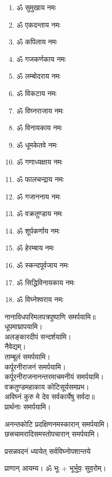 \setlength{\columnseprule}{0pt}
\renewcommand{\labelenumi}{\devanumber\theenumi.}
\begin{multicols}{2}
\begin{enumerate}
\item ॐ सुमुखाय नमः
\item ॐ एकदन्ताय नमः
\item ॐ कपिलाय नमः
\item ॐ गजकर्णकाय नमः
\item ॐ लम्बोदराय नमः
\item ॐ विकटाय नमः
\item ॐ विघ्नराजाय नमः
\item ॐ विनायकाय नमः
\item ॐ धूमकेतवे नमः
\item ॐ गणाध्यक्षाय नमः
\item ॐ फालचन्द्राय नमः
\item ॐ गजाननाय नमः
\item ॐ वक्रतुण्डाय नमः
\item ॐ शूर्पकर्णाय नमः
\item ॐ हेरम्बाय नमः
\item ॐ स्कन्दपूर्वजाय नमः
\item ॐ सिद्धिविनायकाय नमः
\item ॐ विघ्नेश्वराय नमः
\end{enumerate}
\end{multicols}
नानाविधपरिमलपत्रपुष्पाणि समर्पयामि॥\\
धूपमाघ्रापयामि।\\
अलङ्कारदीपं सन्दर्शयामि।\\
नैवेद्यम्।\\
ताम्बूलं समर्पयामि।\\
कर्पूरनीराजनं समर्पयामि।\\
कर्पूरनीराजनानन्तरमाचमनीयं समर्पयामि।\\
{वक्रतुण्डमहाकाय कोटिसूर्यसमप्रभ।}\\
{अविघ्नं कुरु मे देव सर्वकार्येषु सर्वदा॥}\\
प्रार्थनाः समर्पयामि।

अनन्तकोटि प्रदक्षिणनमस्कारान् समर्पयामि।\\
छत्त्रचामरादिसमस्तोपचारान् समर्पयामि।\\


{प्रसन्नवदनं ध्यायेत् सर्वविघ्नोपशान्तये}
 
प्राणान्  आयम्य।  ॐ भूः + भूर्भुवः॒ सुव॒रोम्।


